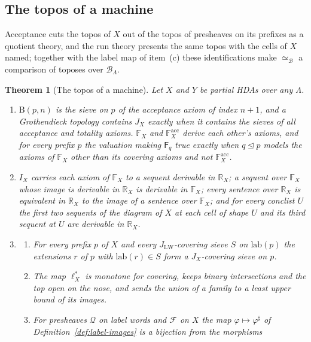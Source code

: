 \documentclass{lmcs}
\newtheorem{theorem}{Theorem}[section]
\theoremstyle{definition}
\theoremstyle{remark}
\newcommand{\JLW}{J_{\LW}}
\newcommand{\ext}{\trianglelefteq}
\newcommand{\JX}[1]{J_{#1}}
\newcommand{\BB}{\mathrm{B}}
\newcommand{\FX}[1]{\mathbb{F}_{#1}}
\newcommand{\RX}[1]{\mathbb{R}_{#1}}
\newcommand{\IX}[1]{I_{#1}}
\newcommand{\fat}[1]{\mathsf{F}_{#1}}
\newcommand{\lab}{\mathrm{lab}}
\newcommand{\LW}{\mathrm{LW}}
\providecommand{\lab}{\mathrm{lab}}
\providecommand{\BL}{\mathcal{B}_{\Lambda}}
\providecommand{\eqB}{\simeq_{\mathcal{B}}}
\providecommand{\lst}[1]{\ell^{*}_{#1}}
\begin{document}
\subsection{The topos of a machine}\label{ssec:topos-a}

Acceptance cuts the topos of $X$ out of the topos of presheaves on its prefixes as a quotient theory, and the run
theory presents the same topos with the cells of $X$ named; together with the label map of item~(c) these
identifications make $\eqB$ a comparison of toposes over $\BL$.

\begin{theorem}[The topos of a machine]\label{thm:topos-a}\label{def:labels-morita}\label{thm:setup-quotient}\label{prop:setup-fbquot}\label{thm:cor638}\label{prop:comorphism}\label{thm:ladder}
Let $X$ and $Y$ be partial HDAs over any $\Lambda$.
\begin{enumerate}
\item[(a)] $\BB(p,n)$ is the sieve on $p$ of the acceptance axiom of index $n+1$, and a
  Grothendieck topology contains $\JX{X}$ exactly when it contains the sieves of all acceptance and totality
  axioms. $\FX{X}$ and $\FX{X}^{\mathrm{acc}}$ derive each other's
  axioms, and for every prefix $p$ the valuation making $\fat{q}$ true exactly when
  $q\ext p$ models the axioms of $\FX{X}$ other than its covering axioms and not $\FX{X}^{\mathrm{acc}}$.
\item[(b)] $\IX{X}$ carries each axiom of $\FX{X}$ to a sequent derivable in
  $\RX{X}$; a sequent over $\FX{X}$ whose image is derivable in $\RX{X}$ is
  derivable in $\FX{X}$; every sentence over $\RX{X}$ is equivalent in $\RX{X}$ to the
  image of a sentence over $\FX{X}$; and for every conclist $U$ the first two
  sequents of the diagram of $X$ at each cell of shape $U$ and its third sequent at $U$ are derivable in
  $\RX{X}$.
\item[(c)] \begin{enumerate}[label=(\roman*),ref=(\roman*)]
  \item For every prefix $p$ of $X$ and every $\JLW$-covering sieve $S$ on $\lab(p)$ the extensions $r$ of $p$
  with $\lab(r)\in S$ form a $\JX{X}$-covering sieve on $p$.
  \item The map $\lst{X}$ is
  monotone for covering, keeps binary intersections
  and the top open on the nose, and sends the union of a family to a least upper bound
  of its images.
  \item For presheaves $\mathscr{Q}$ on label words and $\mathscr{F}$ on $X$
  the map $\varphi\mapsto\varphi^\sharp$ of Definition~\ref{def:label-images} is a bijection from the morphisms

\end{enumerate}
\end{enumerate}
\end{theorem}
\end{document}
